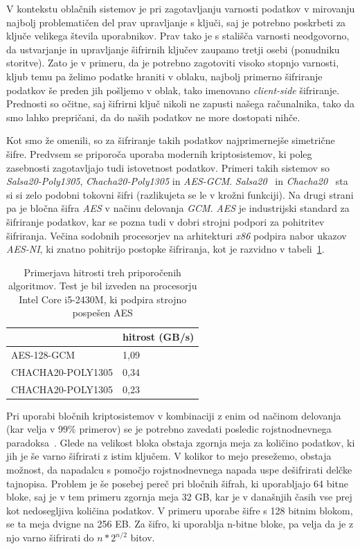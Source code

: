 \documentclass[12pt,a4paper,openany,tikz]{book}
\theoremstyle{plain}
\theoremstyle{definition}
\begin{document}
V kontekstu oblačnih sistemov je pri zagotavljanju varnosti podatkov v mirovanju najbolj problematičen del prav upravljanje s ključi, saj je potrebno poskrbeti za ključe velikega števila uporabnikov. Prav tako je s stališča varnosti neodgovorno, da ustvarjanje in upravljanje šifrirnih ključev zaupamo tretji osebi (ponudniku storitve). Zato je v primeru, da je potrebno zagotoviti visoko stopnjo varnosti, kljub temu pa želimo podatke hraniti v oblaku, najbolj primerno šifriranje podatkov še preden jih pošljemo v oblak, tako imenovano \textit{client-side} šifriranje. Prednosti so očitne, saj šifrirni ključ nikoli ne zapusti našega računalnika, tako da smo lahko prepričani, da do naših podatkov ne more dostopati nihče.

Kot smo že omenili, so za šifriranje takih podatkov najprimernejše simetrične šifre. Predvsem se priporoča uporaba modernih kriptosistemov, ki poleg zasebnosti zagotavljajo tudi istovetnost podatkov. Primeri takih sistemov so \textit{Salsa20-Poly1305}, \textit{Chacha20-Poly1305} in \textit{AES-GCM}. \textit{Salsa20}~\cite{bernstein2008salsa20} in \textit{Chacha20}~\cite{bernstein2008chacha} sta si si zelo podobni tokovni šifri (razlikujeta se le v krožni funkciji). Na drugi strani pa je bločna šifra \textit{AES} v načinu delovanja \textit{GCM}. \textit{AES} je industrijski standard za šifriranje podatkov, kar se pozna tudi v dobri strojni podpori za pohitritev šifriranja. Večina sodobnih procesorjev na arhitekturi \textit{x86} podpira nabor ukazov \textit{AES-NI}, ki znatno pohitrijo postopke šifriranja, kot je razvidno v tabeli~\ref{symmspeed}.

\begin{table}[]
\centering
\begin{tabular}{|l|l|}
\hline
                  & hitrost (GB/s) \\ \hline
AES-128-GCM       & 1,09           \\ \hline
CHACHA20-POLY1305 & 0,34           \\ \hline
CHACHA20-POLY1305 & 0,23           \\ \hline
\end{tabular}
\caption{Primerjava hitrosti treh priporočenih algoritmov. Test je bil izveden na procesorju Intel Core i5-2430M, ki podpira strojno pospešen AES}
\label{symmspeed}
\end{table}

Pri uporabi bločnih kriptosistemov v kombinaciji z enim od načinom delovanja (kar velja v $99\%$ primerov) se je potrebno zavedati posledic rojstnodnevnega paradoksa~\cite{wiki:bdayparadox}. Glede na velikost bloka obstaja zgornja meja za količino podatkov, ki jih je še varno šifrirati z istim ključem. V kolikor to mejo presežemo, obstaja možnost, da napadalcu s pomočjo rojstnodnevnega napada uspe dešifrirati delčke tajnopisa. Problem je še posebej pereč pri bločnih šifrah, ki uporabljajo 64 bitne bloke, saj je v tem primeru zgornja meja 32 GB, kar je v današnjih časih vse prej kot nedosegljiva količina podatkov. V primeru uporabe šifre s 128 bitnim blokom, se ta meja dvigne na 256 EB. Za šifro, ki uporablja n-bitne bloke, pa velja da je z njo varno šifrirati do $n*2^{n/2}$ bitov.
\end{document}
